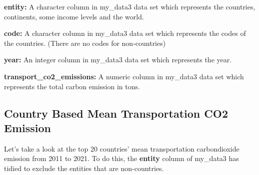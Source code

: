 \documentclass[
  11pt,
  a4paper,
  DIV=11,
  numbers=noendperiod]{scrartcl}
\begin{document}
\textbf{entity:} A character column in my\_data3 data set which
represents the countries, continents, some income levels and the world.

\textbf{code:} A character column in my\_data3 data set which represents
the codes of the countries. (There are no codes for non-countries)

\textbf{year:} An integer column in my\_data3 data set which represents
the year.

\textbf{transport\_co2\_emissions:} A numeric column in my\_data3 data
set which represents the total carbon emission in tons.

\subsection{Country Based Mean Transportation CO2
Emission}\label{country-based-mean-transportation-co2-emission}

Let's take a look at the top 20 countries' mean transportation
carbondioxide emission from 2011 to 2021. To do this, the
\textbf{entity} column of my\_data3 has tidied to exclude the entities
that are non-countries.
\end{document}
